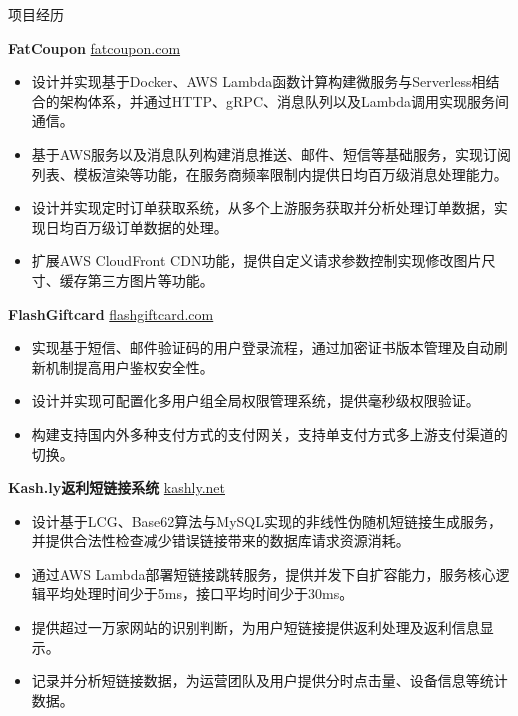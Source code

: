 \documentclass{resume} %
\begin{document}
\begin{rSection}{项目经历}
  \vspace{-1.25em}

  \item \textbf{FatCoupon} {} \hfill \href{https://fatcoupon.com}{fatcoupon.com}
  \begin{itemize}
    \itemsep -3pt {}
    \item 设计并实现基于Docker、AWS Lambda函数计算构建微服务与Serverless相结合的架构体系，并通过HTTP、gRPC、消息队列以及Lambda调用实现服务间通信。
    \item 基于AWS服务以及消息队列构建消息推送、邮件、短信等基础服务，实现订阅列表、模板渲染等功能，在服务商频率限制内提供日均百万级消息处理能力。
    \item 设计并实现定时订单获取系统，从多个上游服务获取并分析处理订单数据，实现日均百万级订单数据的处理。
    \item 扩展AWS CloudFront CDN功能，提供自定义请求参数控制实现修改图片尺寸、缓存第三方图片等功能。
  \end{itemize}

  \item \textbf{FlashGiftcard} {} \hfill \href{https://flashgiftcard.com}{flashgiftcard.com}
  \begin{itemize}
    \itemsep -3pt {}
    \item 实现基于短信、邮件验证码的用户登录流程，通过加密证书版本管理及自动刷新机制提高用户鉴权安全性。
    \item 设计并实现可配置化多用户组全局权限管理系统，提供毫秒级权限验证。
    \item 构建支持国内外多种支付方式的支付网关，支持单支付方式多上游支付渠道的切换。
  \end{itemize}

  \item \textbf{Kash.ly返利短链接系统} {} \hfill \href{https://kashly.net}{kashly.net}
  \begin{itemize}
    \itemsep -3pt {}
    \item 设计基于LCG、Base62算法与MySQL实现的非线性伪随机短链接生成服务，并提供合法性检查减少错误链接带来的数据库请求资源消耗。
    \item 通过AWS Lambda部署短链接跳转服务，提供并发下自扩容能力，服务核心逻辑平均处理时间少于5ms，接口平均时间少于30ms。
    \item 提供超过一万家网站的识别判断，为用户短链接提供返利处理及返利信息显示。
    \item 记录并分析短链接数据，为运营团队及用户提供分时点击量、设备信息等统计数据。
  \end{itemize}


\end{rSection}
\end{document}
